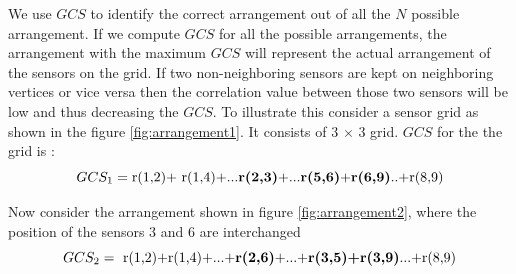 We use $GCS$ to identify the correct arrangement out of all the $N$ possible arrangement. If we compute  $GCS$ for all the possible arrangements, the arrangement with the maximum $GCS$ will represent the actual arrangement of the sensors on the grid.  
If two non-neighboring sensors are kept on neighboring vertices or vice versa then the correlation value between those two sensors will be low and thus decreasing the $GCS$.
To illustrate this consider a sensor grid as shown in the figure \ref{fig:arrangement1}.
 It consists of 3 $\times$ 3 grid.  
$GCS$ for the  the grid is :\\
\begin{equation*}
GCS_{1}=\text{r(1,2)+ r(1,4)+...\textbf{r(2,3)}+...\textbf{r(5,6)}+\textbf{r(6,9)}..+r(8,9)}
\end{equation*}

Now consider the arrangement shown in figure \ref{fig:arrangement2}, where the position of the sensors 3 and 6 are interchanged\\
\begin{equation*}
GCS_{2}=\text{ r(1,2)+r(1,4)+...+\textbf{r(2,6)}+...+\textbf{r(3,5)+r(3,9)}...+r(8,9)}
\end{equation*}

